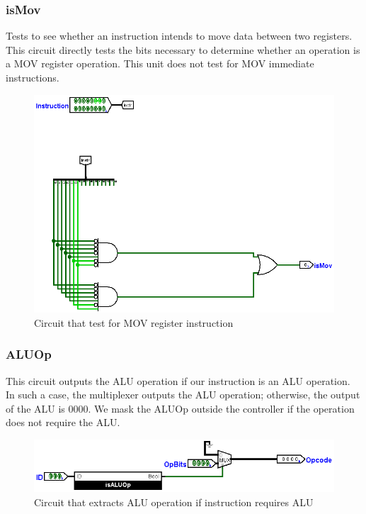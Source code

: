 \documentclass[12pt, letter]{article}
\begin{document}
	
	\subsubsection{isMov}
	
	Tests to see whether an instruction intends to move data between two registers. This circuit directly tests the bits necessary to determine whether an operation is a MOV register operation. This unit does not test for MOV immediate instructions.
	
	\begin{figure}[h]
		\centering
		\includegraphics[scale = 0.3]{isMov}
		\caption{Circuit that test for MOV register instruction}
		\label{fig:IsMov}
	\end{figure}
	\newpage
	
	\subsubsection{ALUOp}
	This circuit outputs the ALU operation if our instruction is an ALU operation. In such a case, the multiplexer outputs the ALU operation; otherwise, the output of the ALU is $0000$. We mask the ALUOp outside the controller if the operation does not require the ALU.
	
	\begin{figure}[h]
		\centering
		\includegraphics[scale = 0.35]{ALUOp}
		\caption{Circuit that extracts ALU operation if instruction requires ALU}
		\label{fig:ALUOp}
	\end{figure}
\end{document}
